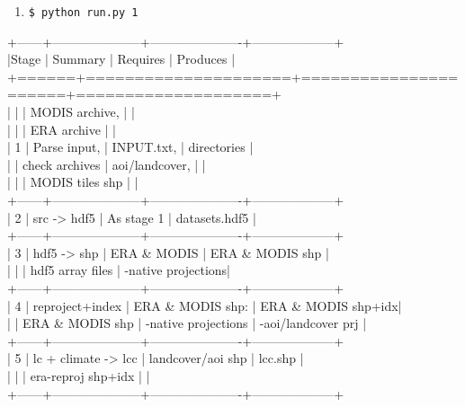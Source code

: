 \documentclass[twoside,a4paper]{refart}
\begin{document}
\begin{enumerate}[1)]
\item
\texttt{\$ python run.py 1}
\end{enumerate}
 +------+---------------------+----------------------+--------------------+\\
    |Stage | Summary             | Requires             | Produces           |\\
    +======+=====================+======================+====================+\\
    |      |                     | MODIS archive,       |                    |\\
    |      |                     | ERA archive          |                    |\\
    | 1    | Parse input,        | INPUT.txt,           | directories        |\\
    |      | check archives      | aoi/landcover,       |                    |\\
    |      |                     | MODIS tiles shp      |                    |\\
    +------+---------------------+----------------------+--------------------+\\
    | 2    | src -> hdf5         | As stage 1           | datasets.hdf5      |\\
    +------+---------------------+----------------------+--------------------+\\
    | 3    | hdf5 -> shp         | ERA \& MODIS          | ERA \& MODIS shp    |\\
    |      |                     | hdf5 array files     | -native projections|\\
    +------+---------------------+----------------------+--------------------+\\
    | 4    | reproject+index     | ERA \& MODIS shp:     | ERA \& MODIS shp+idx|\\
    |      | ERA \& MODIS shp     | -native projections  | -aoi/landcover prj |\\
    +------+---------------------+----------------------+--------------------+\\
    | 5    | lc + climate -> lcc | landcover/aoi shp    | lcc.shp            |\\
    |      |                     | era-reproj shp+idx   |                    |\\
    +------+---------------------+----------------------+--------------------+\\
\end{document}
